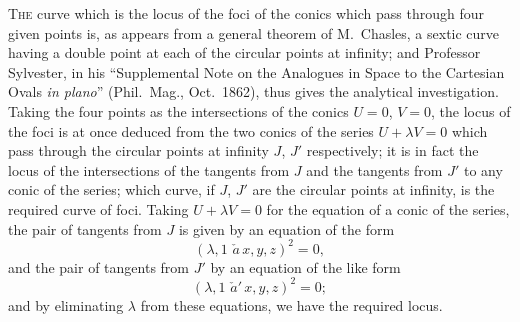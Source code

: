 \documentclass[11pt,a4paper]{article}
\theoremstyle{plain}
\theoremstyle{definition}
\begin{document}
\textsc{The} curve which is the locus of the foci of the conics which pass through four
given points is, as appears from a general theorem of M.~Chasles, a sextic curve
having a double point at each of the circular points at infinity; and Professor
Sylvester, in his ``Supplemental Note on the Analogues in Space to the Cartesian
Ovals \textit{in plano}'' (Phil.\ Mag., Oct.\ 1862), thus gives the analytical investigation.
Taking the four points as the intersections of the conics $U=0$, $V=0$, the locus
of the foci is at once deduced from the two conics of the series $U+\lambda V=0$
which pass through the circular points at infinity $J$, $J'$ respectively; it is in fact
the locus of the intersections of the tangents from $J$ and the tangents from $J'$ to any
conic of the series; which curve, if $J$, $J'$ are the circular points at infinity, is the
required curve of foci.  Taking $U+\lambda V=0$ for the equation of a conic of the series,
the pair of tangents from $J$ is given by an equation of the form
\[
(\lambda, 1 \,\,\check{a}\, x, y, z)^2 = 0,
\]
and the pair of tangents from $J'$ by an equation of the like form
\[
(\lambda, 1 \,\,\check{a}'\, x, y, z)^2 = 0;
\]
and by eliminating $\lambda$ from these equations, we have the required locus.
\end{document}

